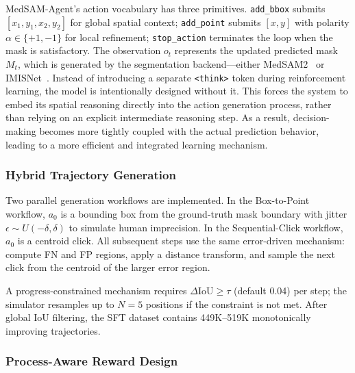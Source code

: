 \documentclass[12pt, a4paper]{article}
\begin{document}
MedSAM-Agent's action vocabulary has three primitives.
\texttt{add\_bbox} submits $[x_1,y_1,x_2,y_2]$ for global spatial context;
\texttt{add\_point} submits $[x,y]$ with polarity $\alpha\in\{+1,-1\}$ for local
refinement; \texttt{stop\_action} terminates the loop when the mask is satisfactory.
The observation $o_t$ represents the updated predicted mask $M_t$, which is generated
by the segmentation backend---either MedSAM2~\cite{medsam2} or
IMISNet~\cite{imisnet}.
Instead of introducing a separate \texttt{<think>} token during reinforcement learning,
the model is intentionally designed without it.
This forces the system to embed its spatial reasoning directly into the action
generation process, rather than relying on an explicit intermediate reasoning step.
As a result, decision-making becomes more tightly coupled with the actual prediction
behavior, leading to a more efficient and integrated learning mechanism.

\subsubsection{Hybrid Trajectory Generation}

Two parallel generation workflows are implemented.
In the Box-to-Point workflow, $a_0$ is a bounding box from the ground-truth mask
boundary with jitter $\epsilon\sim U(-\delta,\delta)$ to simulate human imprecision.
In the Sequential-Click workflow, $a_0$ is a centroid click.
All subsequent steps use the same error-driven mechanism: compute FN and FP regions,
apply a distance transform, and sample the next click from the centroid of the larger
error region.

A progress-constrained mechanism requires $\Delta\text{IoU}\geq\tau$ (default 0.04)
per step; the simulator resamples up to $N=5$ positions if the constraint is not met.
After global IoU filtering, the SFT dataset contains 449K--519K monotonically
improving trajectories.

\subsubsection{Process-Aware Reward Design}
\end{document}

